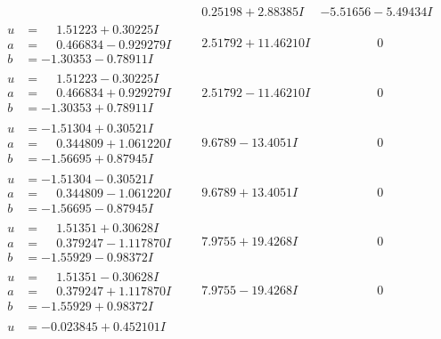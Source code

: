 \documentclass[1p]{elsarticle_modified}
\theoremstyle{definition}
\begin{document}
$$\begin{array}{c|c|c}
 & \phantom{-}0.25198 + 2.88385 I & -5.51656 - 5.49434 I \\ \hline\begin{aligned}
u &= \phantom{-}1.51223 + 0.30225 I \\
a &= \phantom{-}0.466834 - 0.929279 I \\
b &= -1.30353 - 0.78911 I\end{aligned}
 & \phantom{-}2.51792 + 11.46210 I & \phantom{-0.000000 } 0 \\ \hline\begin{aligned}
u &= \phantom{-}1.51223 - 0.30225 I \\
a &= \phantom{-}0.466834 + 0.929279 I \\
b &= -1.30353 + 0.78911 I\end{aligned}
 & \phantom{-}2.51792 - 11.46210 I & \phantom{-0.000000 } 0 \\ \hline\begin{aligned}
u &= -1.51304 + 0.30521 I \\
a &= \phantom{-}0.344809 + 1.061220 I \\
b &= -1.56695 + 0.87945 I\end{aligned}
 & \phantom{-}9.6789 - 13.4051 I & \phantom{-0.000000 } 0 \\ \hline\begin{aligned}
u &= -1.51304 - 0.30521 I \\
a &= \phantom{-}0.344809 - 1.061220 I \\
b &= -1.56695 - 0.87945 I\end{aligned}
 & \phantom{-}9.6789 + 13.4051 I & \phantom{-0.000000 } 0 \\ \hline\begin{aligned}
u &= \phantom{-}1.51351 + 0.30628 I \\
a &= \phantom{-}0.379247 - 1.117870 I \\
b &= -1.55929 - 0.98372 I\end{aligned}
 & \phantom{-}7.9755 + 19.4268 I & \phantom{-0.000000 } 0 \\ \hline\begin{aligned}
u &= \phantom{-}1.51351 - 0.30628 I \\
a &= \phantom{-}0.379247 + 1.117870 I \\
b &= -1.55929 + 0.98372 I\end{aligned}
 & \phantom{-}7.9755 - 19.4268 I & \phantom{-0.000000 } 0 \\ \hline\begin{aligned}
u &= -0.023845 + 0.452101 I \\

\end{aligned}
\end{array}$$
\end{document}
